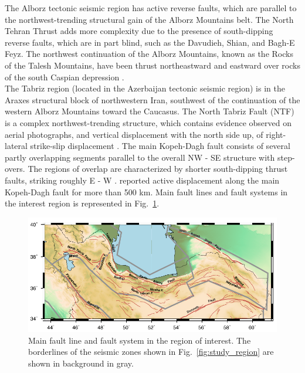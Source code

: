 \noindent
The Alborz tectonic seismic region has active reverse faults, which are parallel to the northwest-trending structural gain of the Alborz Mountains belt. The North Tehran Thrust adds more complexity due to the presence of south-dipping reverse faults, which are in part blind, such as the Davudieh, Shian, and Bagh-E Feyz. The northwest continuation of the Alborz Mountains, known as the Rocks of the Talesh Mountains, have been thrust northeastward and eastward over rocks of the south Caspian depression  \citep{Berberian1999}.\\ 
\noindent
The Tabriz region (located in the Azerbaijan tectonic seismic region) is in the Araxes structural block of northwestern Iran, southwest of the continuation of the western Alborz Mountains toward the Caucasus. The North Tabriz Fault (NTF) is a complex northwest-trending structure, which contains evidence observed on aerial photographs, and vertical displacement with the north side up, of right-lateral strike-slip displacement  \citep{Berberian1999}.
\noindent
The main Kopeh-Dagh fault consists of several partly overlapping segments parallel to the overall  NW - SE  structure with step-overs. The regions of overlap are characterized by shorter south-dipping thrust faults, striking roughly E - W  \citep{Berberian2001}.  \citet{Trifonov1978}  reported active displacement along the main Kopeh-Dagh fault for more than 500 km. Main fault lines and fault systems in the interest region is represented in Fig.~\ref{fig:faults}.


\begin{figure} [ht]
\centering
\includegraphics[scale=1]{figures/pdf/Figure03.pdf} 
\caption{Main fault line and fault system in the region of interest. The borderlines of the seismic zones shown in Fig.~\ref{fig:study_region} are shown in background in gray.}
\label{fig:faults}
\end{figure}



